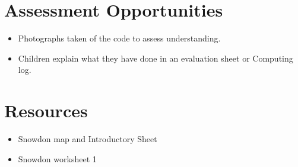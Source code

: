 \documentclass{geocraft-lesson-plan}
\begin{document}
\section*{Assessment Opportunities}
\begin{itemize}
\item Photographs taken of the code to assess understanding. 
\item Children explain what they have done in an evaluation sheet or Computing log.  
\end{itemize}



\section*{Resources}
\begin{itemize}
\item Snowdon map and Introductory Sheet
\item Snowdon worksheet 1
\end{itemize}

\end{document}
